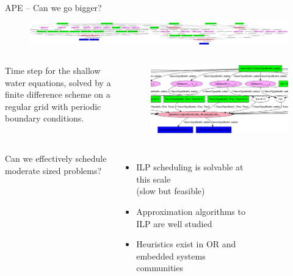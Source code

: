 \documentclass[9pt, compress, blue]{beamer}
\begin{document}
\begin{frame}{APE -- Can we go bigger?}
\begin{figure}[ht]
\vspace{-0pt}
\centering
\includegraphics[width=\textwidth]{f_timeEvolutionScanOp_18}
\end{figure}
\vspace{-10pt}

\begin{columns}
Time step for the shallow water equations, solved
by a finite difference scheme on a regular grid with periodic boundary
conditions.

\begin{figure}[ht]
\vspace{-0pt}
\centering
\includegraphics[width=\textwidth]{f_timeEvolutionScanOp_18_cropped}
\vspace{-0pt}
\vspace{00pt}
\end{figure}
\end{columns}

\vspace{-7pt}

\begin{columns}
Can we effectively schedule moderate sized problems?
\begin{itemize}
\item ILP scheduling is solvable at this scale\\ (slow but feasible)
\item Approximation algorithms to ILP are well studied
\item Heuristics exist in OR and embedded systems communities
\end{itemize}
\begin{figure}
\end{figure}
\end{columns}
\end{frame}
\end{document}
